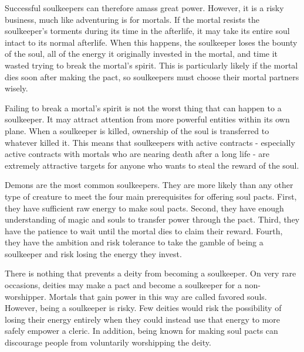       Successful soulkeepers can therefore amass great power.
      However, it is a risky business, much like adventuring is for mortals.
      If the mortal resists the soulkeeper's torments during its time in the afterlife, it may take its entire soul intact to its normal afterlife.
      When this happens, the soulkeeper loses the bounty of the soul, all of the energy it originally invested in the mortal, and time it wasted trying to break the mortal's spirit.
      This is particularly likely if the mortal dies soon after making the pact, so soulkeepers must choose their mortal partners wisely.

      Failing to break a mortal's spirit is not the worst thing that can happen to a soulkeeper.
      It may attract attention from more powerful entities within its own plane.
      When a soulkeeper is killed, ownership of the soul is transferred to whatever killed it.
      This means that soulkeepers with active contracts - especially active contracts with mortals who are nearing death after a long life - are extremely attractive targets for anyone who wants to steal the reward of the soul.

      Demons are the most common soulkeepers.
      They are more likely than any other type of creature to meet the four main prerequisites for offering soul pacts.
      First, they have sufficient raw energy to make soul pacts.
      Second, they have enough understanding of magic and souls to transfer power through the pact.
      Third, they have the patience to wait until the mortal dies to claim their reward.
      Fourth, they have the ambition and risk tolerance to take the gamble of being a soulkeeper and risk losing the energy they invest.

      There is nothing that prevents a deity from becoming a soulkeeper.
      On very rare occasions, deities may make a pact and become a soulkeeper for a non-worshipper.
      Mortals that gain power in this way are called favored souls.
      However, being a soulkeeper is risky.
      Few deities would risk the possibility of losing their energy entirely when they could instead use that energy to more safely empower a cleric.
      In addition, being known for making soul pacts can discourage people from voluntarily worshipping the deity.

